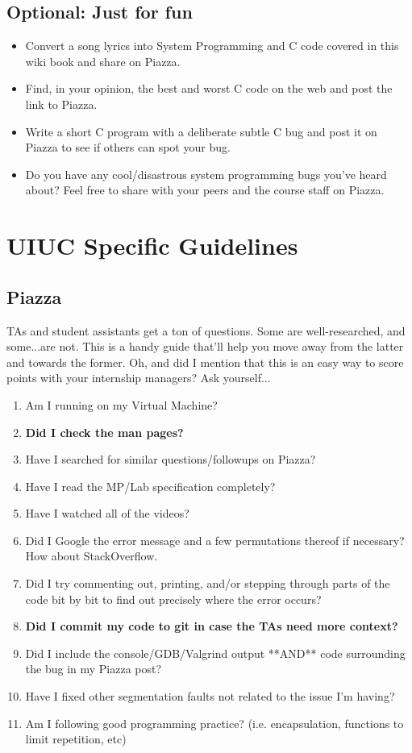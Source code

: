 \subsection{Optional: Just for fun}

\begin{itemize}
\item Convert a song lyrics into System Programming and C code covered in this wiki book and share on Piazza.
\item Find, in your opinion, the best and worst C code on the web and post the link to Piazza.
\item Write a short C program with a deliberate subtle C bug and post it on Piazza to see if others can spot your bug.
\item Do you have any cool/disastrous system programming bugs you've heard about? Feel free to share with your peers and the course staff on Piazza.
\end{itemize}

\section{UIUC Specific Guidelines}

\subsection{Piazza}

TAs and student assistants get a ton of questions.
Some are well-researched, and some...are not.
This is a handy guide that'll help you move away from the latter and towards the former.
Oh, and did I mention that this is an easy way to score points with your internship managers? Ask yourself...

\begin{enumerate}
\item Am I running on my Virtual Machine?
\item \textbf{Did I check the man pages?}
\item Have I searched for similar questions/followups on Piazza?
\item Have I read the MP/Lab specification completely?
\item Have I watched all of the videos?
\item Did I Google the error message and a few permutations thereof if necessary? How about StackOverflow.
\item Did I try commenting out, printing, and/or stepping through parts of the code bit by bit to find out precisely where the error occurs?
\item \textbf{Did I commit my code to git in case the TAs need more context?}
\item Did I include the console/GDB/Valgrind output **AND** code surrounding the bug in my Piazza post?
\item Have I fixed other segmentation faults not related to the issue I'm having?
\item Am I following good programming practice? (i.e. encapsulation, functions to limit repetition, etc)
\end{enumerate}

